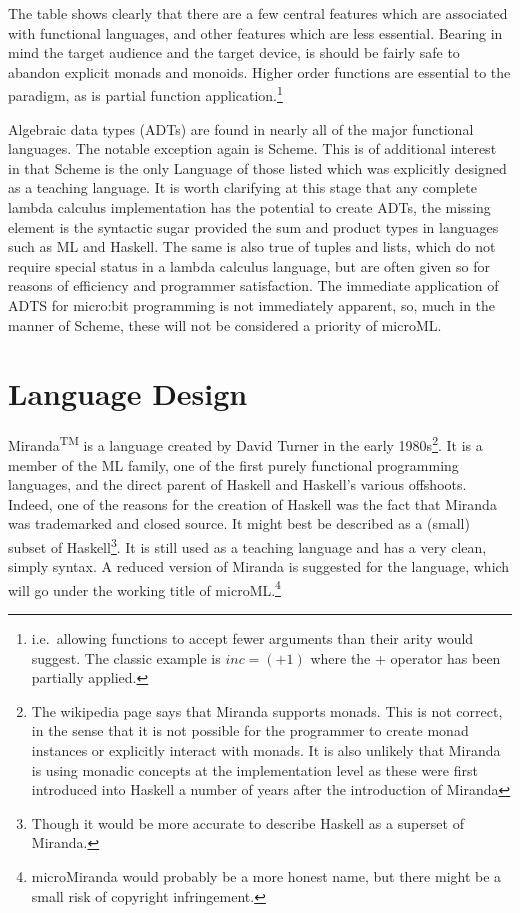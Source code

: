 \documentclass[12pt, a4paper]{report}
\begin{document}
The table shows clearly that there are a few central features which are associated with functional
languages, and other features which are less essential. Bearing in mind the target audience and the
target device, is should be fairly safe to abandon explicit monads and monoids. Higher order functions are
essential to the paradigm, as is partial function application.\footnote{i.e.\ allowing functions to
    accept fewer arguments than their arity would suggest. The classic example is $ inc = (+1) $ where
    the + operator has been partially applied.}

Algebraic data types (ADTs) are found in nearly all of the major functional languages. The notable
exception again is Scheme. This is of additional interest in that Scheme is the only Language of
those listed which was explicitly designed as a teaching language. It is worth clarifying at this
stage that any complete lambda calculus implementation has the potential to create ADTs, the missing
element is the syntactic sugar provided the sum and product types in languages such as ML and
Haskell. The same is also true of tuples and lists, which do not require special status in a
lambda calculus language, but are often given so for reasons of efficiency and programmer
satisfaction. The immediate application of ADTS for micro:bit programming is not immediately
apparent, so, much in the manner of Scheme, these will not be considered a priority of microML.

\section{Language Design} 
Miranda\textsuperscript{TM} is a language
created by David Turner in the early 1980s\footnote{The wikipedia page says that Miranda supports
monads. This is not correct, in the sense that it is not possible for the programmer to create
monad instances or explicitly interact with monads. It is also unlikely that Miranda is using
monadic concepts at the implementation level as these were first introduced into Haskell a number of
years after the introduction of Miranda}. It is a member of the ML family, one of the first purely
functional programming languages, and the direct parent of Haskell and Haskell's various offshoots.
Indeed, one of the reasons for the creation of Haskell was the fact that Miranda was trademarked and
closed source. It might best be described as a (small) subset of Haskell\footnote{Though it would
be more accurate to describe Haskell as a superset of Miranda.}. It is still used as a teaching
language and has a very clean, simply syntax. A reduced version of Miranda is suggested for the
language, which will go under the working title of microML.\footnote{microMiranda would probably be
a more honest name, but there might be a small risk of copyright infringement.}
\end{document}
